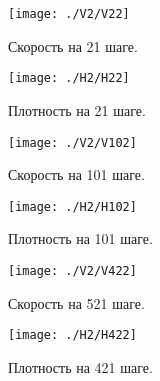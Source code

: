 \documentclass[12pt]{article}
\begin{document}
\begin{figure}[h]
\begin{center}
\begin{minipage}[h]{0.4\linewidth}
\texttt{[image: ./V2/V22]}
\caption{Скорость на 21 шаге.} %
\end{minipage}
\hfill 
\begin{minipage}[h]{0.4\linewidth}
\texttt{[image: ./H2/H22]}
\caption{Плотность на 21 шаге.}
\end{minipage}
\end{center}
\end{figure}

\begin{figure}[h]
\begin{center}
\begin{minipage}[h]{0.4\linewidth}
\texttt{[image: ./V2/V102]}
\caption{Скорость на 101 шаге.} %
\end{minipage}
\hfill 
\begin{minipage}[h]{0.4\linewidth}
\texttt{[image: ./H2/H102]}
\caption{Плотность на 101 шаге.}
\end{minipage}
\end{center}
\end{figure}

\begin{figure}[h]
\begin{center}
\begin{minipage}[h]{0.4\linewidth}
\texttt{[image: ./V2/V422]}
\caption{Скорость на 521 шаге.} %
\end{minipage}
\hfill 
\begin{minipage}[h]{0.4\linewidth}
\texttt{[image: ./H2/H422]}
\caption{Плотность на 421 шаге.}
\end{minipage}
\end{center}
\end{figure}
\end{document}
